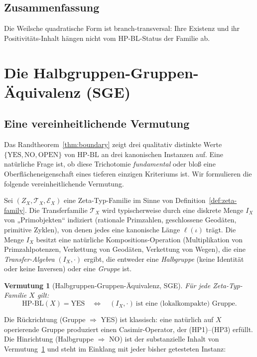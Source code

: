 \documentclass[11pt]{article}
\newtheorem{conjecture}[theorem]{Vermutung}
\theoremstyle{definition}
\theoremstyle{remark}
\newcommand{\HBL}{\mathrm{HP\text{-}BL}}
\begin{document}
\subsection{Zusammenfassung}

Die Weilsche quadratische Form ist branch-transversal: Ihre Existenz und ihr
Positivitäts-Inhalt hängen nicht vom HP-BL-Status der Familie ab.

\section{Die Halbgruppen-Gruppen-Äquivalenz (SGE)}
\label{sec:sge-conjecture}

\subsection{Eine vereinheitlichende Vermutung}
\label{sec:sge-conjecture-statement}

Das Randtheorem~\ref{thm:boundary} zeigt drei qualitativ distinkte Werte
$\{\mathrm{YES}, \mathrm{NO}, \mathrm{OPEN}\}$ von $\HBL$ an drei kanonischen Instanzen
auf. Eine natürliche Frage ist, ob diese Trichotomie \emph{fundamental}
oder bloß eine Oberflächeneigenschaft eines tieferen einzigen Kriteriums ist.
Wir formulieren die folgende vereinheitlichende Vermutung.

Sei $(Z_X, \mathcal{T}_X, \mathcal{E}_X)$ eine Zeta-Typ-Familie im Sinne von
Definition~\ref{def:zeta-family}. Die Transferfamilie $\mathcal{T}_X$ wird
typischerweise durch eine diskrete Menge $I_X$ von „Primobjekten“ indiziert (rationale Primzahlen,
geschlossene Geodäten, primitive Zyklen), von denen jedes eine kanonische
Länge $\ell(\iota)$ trägt. Die Menge $I_X$ besitzt eine natürliche Kompositions-Operation
(Multiplikation von Primzahlpotenzen, Verkettung von Geodäten, Verkettung von Wegen),
die eine \emph{Transfer-Algebra} $(I_X, \cdot)$ ergibt, die entweder eine
\emph{Halbgruppe} (keine Identität oder keine Inversen) oder eine \emph{Gruppe} ist.

\begin{conjecture}[Halbgruppen-Gruppen-Äquivalenz, SGE]
\label{conj:sge}
Für jede Zeta-Typ-Familie $X$ gilt:
\[
  \HBL(X) = \mathrm{YES}
  \quad\Longleftrightarrow\quad
  (I_X, \cdot)\ \text{ist eine (lokalkompakte) Gruppe}.
\]
\end{conjecture}

Die Rückrichtung (Gruppe $\Rightarrow$ YES) ist klassisch: eine natürlich
auf $X$ operierende Gruppe produziert einen Casimir-Operator, der
(HP1)--(HP3) erfüllt. Die Hinrichtung (Halbgruppe $\Rightarrow$ NO) ist der
substanzielle Inhalt von Vermutung~\ref{conj:sge} und steht im Einklang mit
jeder bisher getesteten Instanz:
\end{document}

